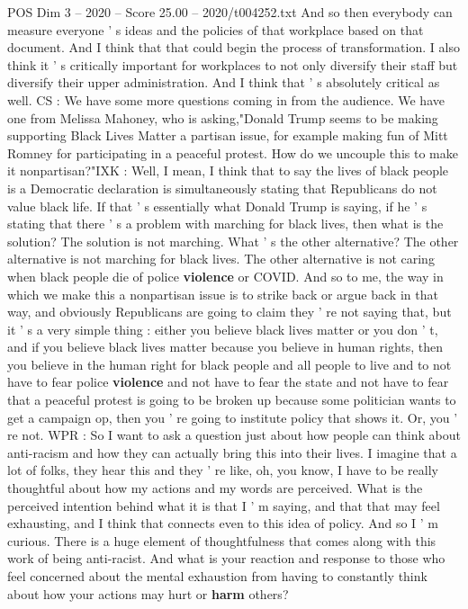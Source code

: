 \begin{textsample}{POS Dim 3 – 2020 – Score 25.00 – 2020/t004252.txt}
And so then everybody can measure everyone ' s ideas and the policies of that workplace based on that document.
And I think that that could begin the process of transformation.
I also think it ' s critically important for workplaces to not only diversify their staff but diversify their upper administration.
And I think that ' s absolutely critical as well.
CS : We have some more questions coming in from the audience.
We have one from Melissa Mahoney, who is asking,"Donald Trump seems to be making supporting Black Lives Matter a partisan issue, for example making fun of Mitt Romney for participating in a peaceful protest.
How do we uncouple this to make it nonpartisan?"IXK : Well, I mean, I think that to say the lives of black people is a Democratic declaration is simultaneously stating that Republicans do not value black life.
If that ' s essentially what Donald Trump is saying, if he ' s stating that there ' s a problem with marching for black lives, then what is the solution?
The solution is not marching.
What ' s the other alternative?
The other alternative is not marching for black lives.
The other alternative is not caring when black people die of police \textbf{violence} or COVID.
And so to me, the way in which we make this a nonpartisan issue is to strike back or argue back in that way, and obviously Republicans are going to claim they ' re not saying that, but it ' s a very simple thing : either you believe black lives matter or you don ' t, and if you believe black lives matter because you believe in human rights, then you believe in the human right for black people and all people to live and to not have to fear police \textbf{violence} and not have to fear the state and not have to fear that a peaceful protest is going to be broken up because some politician wants to get a campaign op, then you ' re going to institute policy that shows it.
Or, you ' re not.
WPR : So I want to ask a question just about how people can think about anti-racism and how they can actually bring this into their lives.
I imagine that a lot of folks, they hear this and they ' re like, oh, you know, I have to be really thoughtful about how my actions and my words are perceived.
What is the perceived intention behind what it is that I ' m saying, and that that may feel exhausting, and I think that connects even to this idea of policy.
And so I ' m curious.
There is a huge element of thoughtfulness that comes along with this work of being anti-racist.
And what is your reaction and response to those who feel concerned about the mental exhaustion from having to constantly think about how your actions may hurt or \textbf{harm} others?

\end{textsample}
